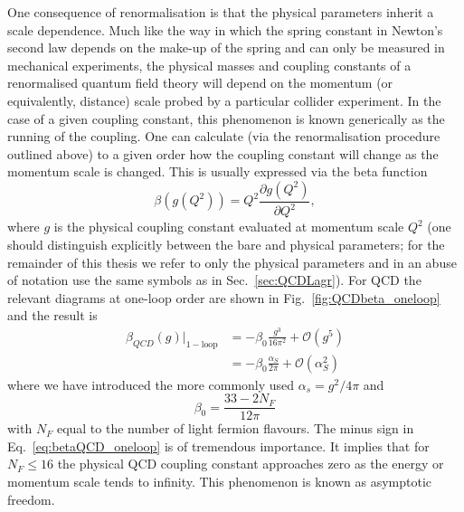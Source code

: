 \documentclass[11pt, a4paper, twoside]{book}
\newcommand{\brac}[1] {\!\left(#1\right)}
\begin{document}
One consequence of renormalisation is that the physical parameters inherit a scale dependence. Much like the way in which the spring constant in Newton's second law depends on the make-up of the spring and can only be measured in mechanical experiments, the physical masses and coupling constants of a renormalised quantum field theory will depend on the momentum (or equivalently, distance) scale probed by a particular collider experiment. In the case of a given coupling constant, this phenomenon is known generically as the running of the coupling. One can calculate (via the renormalisation procedure outlined above) to a given order how the coupling constant will change as the momentum scale is changed. This is usually expressed via the beta function
\begin{equation}
\label{eq:betafunc}
\beta\brac{g\brac{Q^2}}=Q^2\frac{\partial g\brac{Q^2}}{\partial Q^2},
\end{equation}
where \(g\) is the physical coupling constant evaluated at momentum scale \(Q^2\) (one should distinguish explicitly between the bare and physical parameters; for the remainder of this thesis we refer to only the physical parameters and in an abuse of notation use the same symbols as in Sec.~\ref{sec:QCDLagr}). For QCD the relevant diagrams at one-loop order are shown in Fig.~\ref{fig:QCDbeta_oneloop} and the result is
\begin{align}
\label{eq:betaQCD_oneloop}
\beta_{QCD}\brac{g}\lvert_{\mathrm{1-loop}}&=-\beta_0\frac{g^3}{16\pi^2}+\mathcal{O}\brac{g^5} \\[1.5ex]
&= -\beta_0\frac{\alpha_S}{2\pi}+\mathcal{O}\brac{\alpha_S^2} \label{eq:betaQCD_oneloop_alpha}
\end{align}
where we have introduced the more commonly used \(\alpha_s=g^2/4\pi\) and
\begin{equation}
\beta_0=\frac{33-2 N_F}{12\pi}
\end{equation}
with \(N_F\) equal to the number of light fermion flavours. The minus sign in Eq.~\eqref{eq:betaQCD_oneloop} is of tremendous importance. It implies that for \(N_F\leq 16\) the physical QCD coupling constant approaches zero as the energy or momentum scale tends to infinity. This phenomenon is known as asymptotic freedom.
\end{document}
